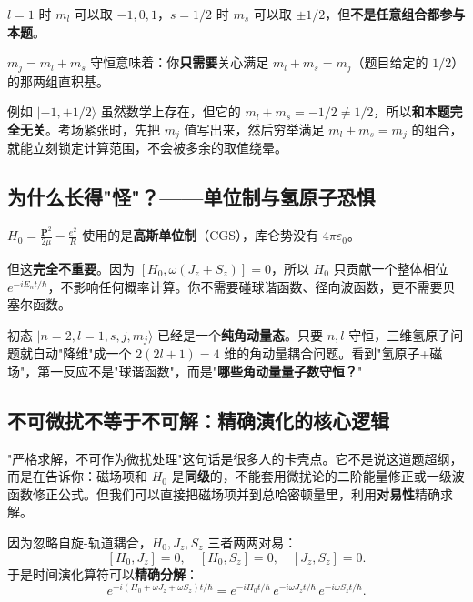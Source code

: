 \begin{cheatbox}
\begin{insightbox}
$l=1$ 时 $m_l$ 可以取 $-1,0,1$，$s=1/2$ 时 $m_s$ 可以取 $\pm 1/2$，但\textbf{不是任意组合都参与本题}。

$m_j = m_l + m_s$ 守恒意味着：你\textbf{只需要}关心满足 $m_l + m_s = m_j$（题目给定的 $1/2$）的那两组直积基。

例如 $|-1, +1/2\rangle$ 虽然数学上存在，但它的 $m_l+m_s = -1/2 \neq 1/2$，所以\textbf{和本题完全无关}。考场紧张时，先把 $m_j$ 值写出来，然后穷举满足 $m_l+m_s=m_j$ 的组合，就能立刻锁定计算范围，不会被多余的取值绕晕。
\end{insightbox}
\end{cheatbox}

\subsection{为什么长得"怪"？——单位制与氢原子恐惧}

\begin{tipbox}[单位制脱敏]
$H_0 = \frac{\bm{P}^2}{2\mu} - \frac{e^2}{R}$ 使用的是\textbf{高斯单位制}（CGS），库仑势没有 $4\pi\varepsilon_0$。

但这\textbf{完全不重要}。因为 $[H_0, \omega(J_z+S_z)]=0$，所以 $H_0$ 只贡献一个整体相位 $e^{-iE_n t/\hbar}$，不影响任何概率计算。你不需要碰球谐函数、径向波函数，更不需要贝塞尔函数。
\end{tipbox}

\begin{warnbox}[破除氢原子恐惧]
初态 $|n=2, l=1, s, j, m_j\rangle$ 已经是一个\textbf{纯角动量态}。只要 $n, l$ 守恒，三维氢原子问题就自动"降维"成一个 $2(2l+1)=4$ 维的角动量耦合问题。看到"氢原子+磁场"，第一反应不是"球谐函数"，而是"\textbf{哪些角动量量子数守恒？}"
\end{warnbox}

\subsection{不可微扰不等于不可解：精确演化的核心逻辑}

"严格求解，不可作为微扰处理"这句话是很多人的卡壳点。它不是说这道题超纲，而是在告诉你：磁场项和 $H_0$ 是\textbf{同级}的，不能套用微扰论的二阶能量修正或一级波函数修正公式。但我们可以直接把磁场项并到总哈密顿量里，利用\textbf{对易性}精确求解。

因为忽略自旋-轨道耦合，$H_0, J_z, S_z$ 三者两两对易：
\[
[H_0, J_z]=0, \quad [H_0, S_z]=0, \quad [J_z, S_z]=0.
\]
于是时间演化算符可以\textbf{精确分解}：
\[
\boxed{e^{-i(H_0+\omega J_z+\omega S_z)t/\hbar} = e^{-iH_0 t/\hbar}\, e^{-i\omega J_z t/\hbar}\, e^{-i\omega S_z t/\hbar}}.
\]

